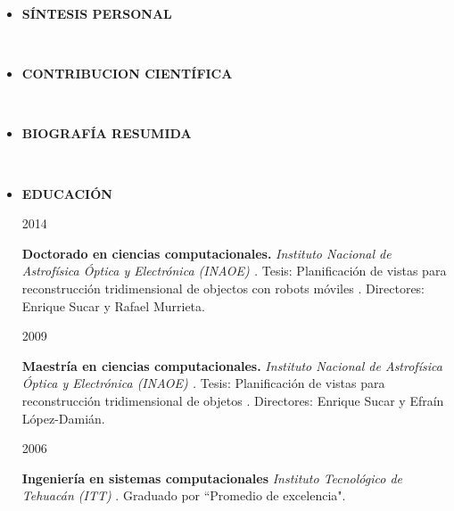 \documentclass[10pt]{article}
\begin{document}
\begin{itemize}
	
\item{\bf SÍNTESIS PERSONAL}

 \\

\item{\bf CONTRIBUCION CIENTÍFICA} 

 \\

\item{\bf BIOGRAFÍA RESUMIDA}

 \\
	
\item{\bf EDUCACIÓN} \\

\begin{minipage}{1.5 in}
	2014\\
\end{minipage}
\begin{minipage}{4.5in}
	\textbf{Doctorado en ciencias computacionales.} \textit{Instituto Nacional de Astrofísica Óptica y Electrónica (INAOE) \href{https://www.inaoep.mx/}{\faExternalLink}.} Tesis: Planificación de vistas para reconstrucción tridimensional de objectos con robots móviles \href{https://jivasquez.files.wordpress.com/2015/03/tesis-doctorado.pdf}{\faFilePdfO}. Directores: Enrique Sucar y Rafael Murrieta.\\ 
\end{minipage}

\begin{minipage}{1.5 in}
	2009\\
\end{minipage}
\begin{minipage}{4.5in}
	\textbf{Maestría en ciencias computacionales.} \textit{Instituto Nacional de Astrofísica Óptica y Electrónica (INAOE) \href{https://www.inaoep.mx/}{\faExternalLink}.} Tesis: Planificación de vistas para reconstrucción tridimensional de objetos \href{https://jivasquez.files.wordpress.com/2015/03/tesis-maestria.pdf}{\faFilePdfO}. Directores: Enrique Sucar y Efraín López-Damián.\\ 
\end{minipage}

\begin{minipage}{1.5 in}
	2006\\
\end{minipage}
\begin{minipage}{4.5in}
	\textbf{Ingeniería en sistemas computacionales} \textit{Instituto Tecnológico de Tehuacán (ITT)} \href{http://www.ittehuacan.edu.mx/}{\faExternalLink}. Graduado por ``Promedio de excelencia".\\ 
\end{minipage} 


\end{itemize}
\end{document}
